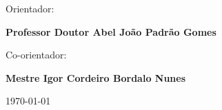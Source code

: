 \vspace{\vspacepre}
\begin{center}
\begin{normalsize}
\begin{large}
Orientador:
\end{large}
\end{normalsize}
\end{center}

\vspace{\vspaceinner}
\begin{center}
\begin{large}
\textbf{Professor Doutor Abel João Padrão Gomes}
\end{large}
\end{center}

\vspace{\vspacepre}
\begin{center}
\begin{normalsize}
\begin{large}
Co-orientador:
\end{large}
\end{normalsize}
\end{center}

\vspace{\vspaceinner}
\begin{center}
\begin{large}
\textbf{Mestre Igor Cordeiro Bordalo Nunes}
\end{large}
\end{center}



\vspace{\vspacepre}
\begin{center}
\begin{normalsize}
\today
\end{normalsize}
\end{center}
